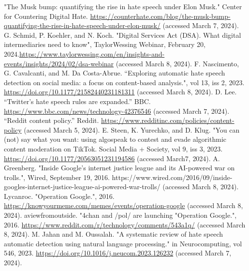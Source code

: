 \documentclass[conference]{IEEEtran}
\begin{document}
\begin{thebibliography}{00}

"The Musk bump: quantifying the rise in hate speech under Elon Musk." Center for Countering Digital Hate. \href{https://counterhate.com/blog/the-musk-bump-quantifying-the-rise-in-hate-speech-under-elon-musk}{https://counterhate.com/blog/the-musk-bump-quantifying-the-rise-in-hate-speech-under-elon-musk/} (accessed March 7, 2024).
G. Schmid, P. Koehler, and N. Koch. "Digital Services Act (DSA). What digital intermediaries need to know", TaylorWessing Webinar, February 20, 2024.\href{https://www.taylorwessing.com/en/insights-and-events/insights/2024/02/dsa-webinar}{https://www.taylorwessing.com/en/insights-and-events/insights/2024/02/dsa-webinar} (accessed March 8, 2024).
F. Nascimento, G. Cavalcanti, and M. Da Costa-Abrue. “Exploring automatic hate speech detection on social media: a focus on content-based analysis.", vol 13, iss 2, 2023. \href{https://doi.org/10.1177/21582440231181311}{https://doi.org/10.1177/21582440231181311} (accessed March 8, 2024).
D. Lee. “Twitter's hate speech rules are expanded.” BBC. \href{https://www.bbc.com/news/technology-42376546}{https://www.bbc.com/news/technology-42376546} (accessed March 7, 2024).
 “Reddit content policy.” Reddit. \href{https://www.redditinc.com/policies/content-policy}{https://www.redditinc.com/policies/content-policy} (accessed March 5, 2024).
E. Steen, K. Yurechko, and D. Klug. "You can (not) say what you want: using algospeak to contest and evade algorithmic content moderation on TikTok. Social Media + Society, vol 9, iss 3, 2023. \href{https://doi.org/10.1177/20563051231194586}{https://doi.org/10.1177/20563051231194586} (accessed March7, 2024).
A. Greenberg. "Inside Google’s internet justice league and its AI-powered war on trolls.", Wired, September 19, 2016. https://www.wired.com/2016/09/inside-googles-internet-justice-league-ai-powered-war-trolls/ (accessed March 8, 2024).
 Lycanroc. "Operation Google.", 2016. \href{https://knowyourmeme.com/memes/events/operation-google}{https://knowyourmeme.com/memes/events/operation-google} (accessed March 8, 2024).
 aviewfromoutside. "4chan and /pol/ are launching "Operation Google.", 2016. \href{https://www.reddit.com/r/technology/comments/543a1q/}{https://www.reddit.com/r/technology/comments/543a1q/} (accessed March 8, 2024).
M. Jahan and M. Oussalah. "A systematic review of hate speech automatic detection using natural language processing." in Neurocomputing, vol 546, 2023. \href{https://doi.org/10.1016/j.neucom.2023.126232}{https://doi.org/10.1016/j.neucom.2023.126232} (accessed March 7, 2024).

\end{thebibliography}
\end{document}
